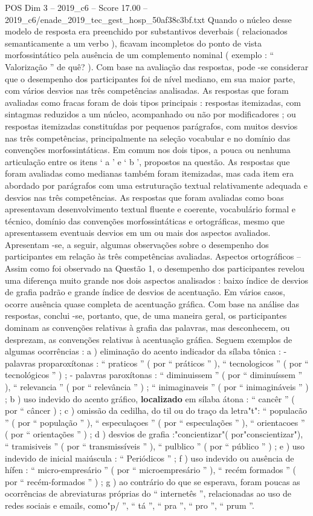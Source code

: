 \begin{textsample}{POS Dim 3 – 2019\_c6 – Score 17.00 – 2019\_c6/enade\_2019\_tec\_gest\_hosp\_50af38c3bf.txt}
Quando o núcleo desse modelo de resposta era preenchido por substantivos deverbais ( relacionados semanticamente a um verbo ), ficavam incompletos do ponto de vista morfossintático pela ausência de um complemento nominal ( exemplo : “ Valorização ” de quê? ).
Com base na avaliação das respostas, pode -se considerar que o desempenho dos participantes foi de nível mediano, em sua maior parte, com vários desvios nas três competências analisadas.
As respostas que foram avaliadas como fracas foram de dois tipos principais : respostas itemizadas, com sintagmas reduzidos a um núcleo, acompanhado ou não por modificadores ; ou respostas itemizadas constituídas por pequenos parágrafos, com muitos desvios nas três competências, principalmente na seleção vocabular e no domínio das convenções morfossintáticas.
Em comum nos dois tipos, a pouca ou nenhuma articulação entre os itens ‘ a ’ e ‘ b ’, propostos na questão.
As respostas que foram avaliadas como medianas também foram itemizadas, mas cada item era abordado por parágrafos com uma estruturação textual relativamente adequada e desvios nas três competências.
As respostas que foram avaliadas como boas apresentavam desenvolvimento textual fluente e coerente, vocabulário formal e técnico, domínio das convenções morfossintáticas e ortográficas, mesmo que apresentassem eventuais desvios em um ou mais dos aspectos avaliados.
Apresentam -se, a seguir, algumas observações sobre o desempenho dos participantes em relação às três competências avaliadas.
Aspectos ortográficos – Assim como foi observado na Questão 1, o desempenho dos participantes revelou uma diferença muito grande nos dois aspectos analisados : baixo índice de desvios de grafia padrão e grande índice de desvios de acentuação.
Em vários casos, ocorre ausência quase completa de acentuação gráfica.
Com base na análise das respostas, conclui -se, portanto, que, de uma maneira geral, os participantes dominam as convenções relativas à grafia das palavras, mas desconhecem, ou desprezam, as convenções relativas à acentuação gráfica.
Seguem exemplos de algumas ocorrências : a ) eliminação do acento indicador da sílaba tônica : - palavras proparoxítonas : “ praticos ” ( por “ práticos ” ), “ tecnologicos ” ( por “ tecnológicos ” ) ; - palavras paroxítonas : “ diminuissem ” ( por “ diminuíssem ” ), “ relevancia ” ( por “ relevância ” ) ; “ inimaginaveis ” ( por “ inimagináveis ” ) ; b ) uso indevido do acento gráfico, \textbf{localizado} em sílaba átona : “ cancêr ” ( por “ câncer ) ; c ) omissão da cedilha, do til ou do traço da letra"t": “ populacão ” ( por “ população ” ), “ especulaçoes ” ( por “ especulações ” ), “ orientacoes ” ( por “ orientações ” ) ; d ) desvios de grafia :"concientizar"( por"conscientizar"), “ tramisiveis ” ( por “ transmissíveis ” ), “ pulblico ” ( por “ público ” ) ; e ) uso indevido de inicial maiúscula : “ Periódicos ” ; f ) uso indevido ou ausência de hífen : “ micro-empresário ” ( por “ microempresário ” ), “ recém formados ” ( por “ recém-formados ” ) ; g ) ao contrário do que se esperava, foram poucas as ocorrências de abreviaturas próprias do “ internetês ”, relacionadas ao uso de redes sociais e emails, como"p/ ”, “ tá ”, “ pra ”, “ pro ”, “ prum ”.

\end{textsample}
